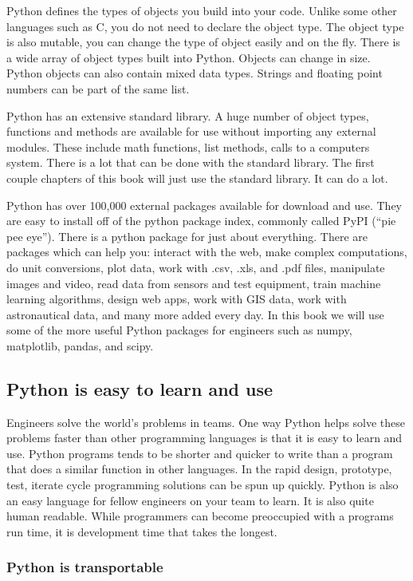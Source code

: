 \documentclass{book}
\begin{document}
Python defines the types of objects you build into your code. Unlike
some other languages such as C, you do not need to declare the object
type. The object type is also mutable, you can change the type of object
easily and on the fly. There is a wide array of object types built into
Python. Objects can change in size. Python objects can also contain
mixed data types. Strings and floating point numbers can be part of the
same list.

Python has an extensive standard library. A huge number of object types,
functions and methods are available for use without importing any
external modules. These include math functions, list methods, calls to a
computers system. There is a lot that can be done with the standard
library. The first couple chapters of this book will just use the
standard library. It can do a lot.

Python has over 100,000 external packages available for download and
use. They are easy to install off of the python package index, commonly
called PyPI (``pie pee eye''). There is a python package for just about
everything. There are packages which can help you: interact with the
web, make complex computations, do unit conversions, plot data, work
with .csv, .xls, and .pdf files, manipulate images and video, read data
from sensors and test equipment, train machine learning algorithms,
design web apps, work with GIS data, work with astronautical data, and
many more added every day. In this book we will use some of the more
useful Python packages for engineers such as numpy, matplotlib, pandas,
and scipy.

    \subsection{Python is easy to learn and
use}\label{python-is-easy-to-learn-and-use}

Engineers solve the world's problems in teams. One way Python helps
solve these problems faster than other programming languages is that it
is easy to learn and use. Python programs tends to be shorter and
quicker to write than a program that does a similar function in other
languages. In the rapid design, prototype, test, iterate cycle
programming solutions can be spun up quickly. Python is also an easy
language for fellow engineers on your team to learn. It is also quite
human readable. While programmers can become preoccupied with a programs
run time, it is development time that takes the longest.

\subsubsection{Python is transportable}\label{python-is-transportable}
\end{document}
